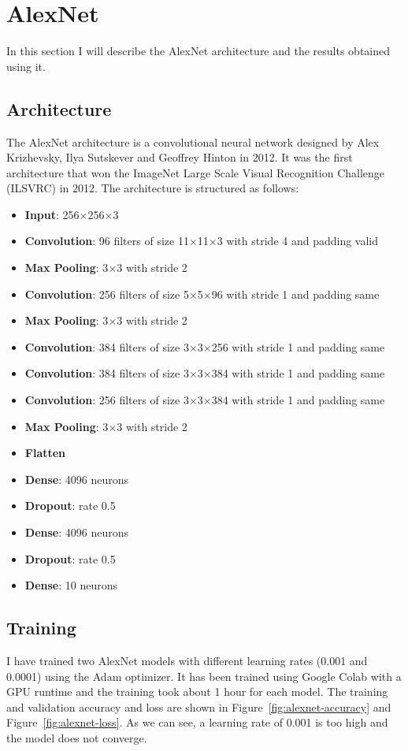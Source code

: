 \section{AlexNet}\label{sec:alexnet}
In this section I will describe the AlexNet architecture and the results obtained using it.

\subsection{Architecture}\label{sec:alexnet-architecture}
The AlexNet architecture is a convolutional neural network designed by Alex Krizhevsky, Ilya Sutskever and Geoffrey Hinton in 2012.
It was the first architecture that won the ImageNet Large Scale Visual Recognition Challenge (ILSVRC) in 2012.
The architecture is structured as follows:
\begin{itemize}
    \item \textbf{Input}: 256$\times$256$\times$3
    \item \textbf{Convolution}: 96 filters of size 11$\times$11$\times$3 with stride 4 and padding valid
    \item \textbf{Max Pooling}: 3$\times$3 with stride 2
    \item \textbf{Convolution}: 256 filters of size 5$\times$5$\times$96 with stride 1 and padding same
    \item \textbf{Max Pooling}: 3$\times$3 with stride 2
    \item \textbf{Convolution}: 384 filters of size 3$\times$3$\times$256 with stride 1 and padding same
    \item \textbf{Convolution}: 384 filters of size 3$\times$3$\times$384 with stride 1 and padding same
    \item \textbf{Convolution}: 256 filters of size 3$\times$3$\times$384 with stride 1 and padding same
    \item \textbf{Max Pooling}: 3$\times$3 with stride 2
    \item \textbf{Flatten}
    \item \textbf{Dense}: 4096 neurons
    \item \textbf{Dropout}: rate 0.5
    \item \textbf{Dense}: 4096 neurons
    \item \textbf{Dropout}: rate 0.5
    \item \textbf{Dense}: 10 neurons
\end{itemize}
\newpage
\subsection{Training}\label{sec:alexnet-training}
I have trained two AlexNet models with different learning rates (0.001 and 0.0001) using the Adam optimizer.
It has been trained using Google Colab with a GPU runtime and the training took about 1 hour for each model.
The training and validation accuracy and loss are shown in Figure~\ref{fig:alexnet-accuracy} and Figure~\ref{fig:alexnet-loss}.
As we can see, a learning rate of 0.001 is too high and the model does not converge.

